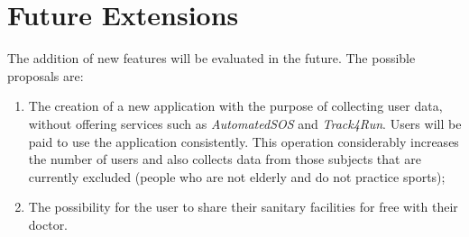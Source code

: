 \section{Future Extensions}
The addition of new features will be evaluated in the future. The possible proposals are:
\begin{enumerate}
  \item The creation of a new application with the purpose of collecting user data, without offering services such as \textit{AutomatedSOS} and \textit{Track4Run}. Users will be paid to use the application consistently. This operation considerably increases the number of users and also collects data from those subjects that are currently excluded (people who are not elderly and do not practice sports);
  \item The possibility for the user to share their sanitary facilities for free with their doctor.
\end{enumerate}
